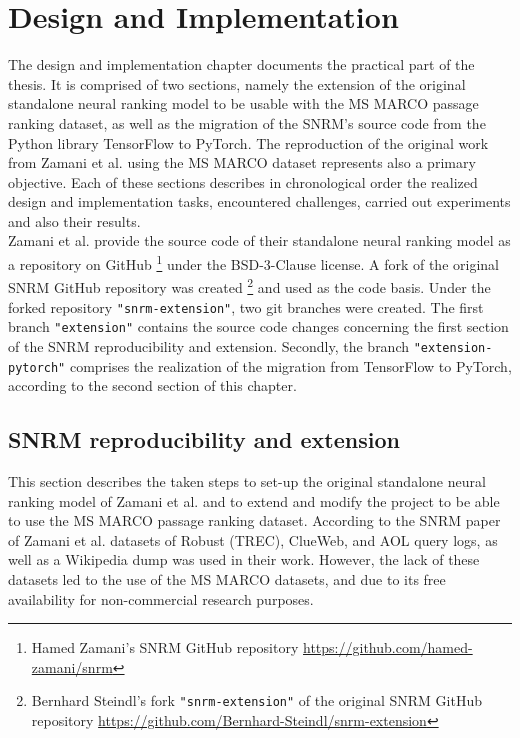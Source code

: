 \chapter{Design and Implementation} \label{chapter:design-and-implementation}

The design and implementation chapter documents the practical part of the thesis.
It is comprised of two sections, namely the extension of the original standalone neural
    ranking model to be usable with the MS MARCO passage ranking dataset,
    as well as the migration of the SNRM's source code from the Python library TensorFlow 
    to PyTorch.
The reproduction of the original work from 
    Zamani et al. \cite{zamani:2018:from-neural-reranking-to-neural-ranking}
    using the MS MARCO dataset represents also a primary objective.
Each of these sections describes in chronological order the realized
    design and implementation tasks, encountered challenges, 
    carried out experiments and also their results.\\
Zamani et al. provide the source code of their standalone neural ranking model as a
    repository on GitHub
    \footnote{Hamed Zamani's SNRM GitHub repository \url{https://github.com/hamed-zamani/snrm}}
    under the BSD-3-Clause license.
A fork of the original SNRM GitHub repository was created
    \footnote{Bernhard Steindl's fork \texttt{"snrm-extension"} of the original SNRM GitHub repository \url{https://github.com/Bernhard-Steindl/snrm-extension}}
    and used as the code basis.
Under the forked repository \texttt{"snrm-extension"}, two git branches were created.
The first branch \texttt{"extension"} contains the source code changes concerning the first
    section of the SNRM reproducibility and extension.
Secondly, the branch \texttt{"extension-pytorch"} comprises the realization of the migration
    from TensorFlow to PyTorch, according to the second section of this chapter.


\section{SNRM reproducibility and extension}
This section describes the taken steps to set-up the original standalone neural ranking model of Zamani et al.
    and to extend and modify the project to be able to use the MS MARCO passage ranking dataset.
According to the SNRM paper of Zamani et al. \cite{zamani:2018:from-neural-reranking-to-neural-ranking} 
    datasets of Robust (TREC), ClueWeb, and AOL query logs, as well as a Wikipedia dump was used
    in their work.
However, the lack of these datasets led to the use of the MS MARCO datasets, 
    and due to its free availability for non-commercial research purposes.


